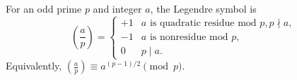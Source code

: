 For an odd prime $p$ and integer $a$, the Legendre symbol is
$$\left(\frac{a}{p}\right) = \begin{cases} +1 & a \text{ is quadratic residue mod } p, p \nmid a, \\ -1 & a \text{ is nonresidue mod } p, \\ 0 & p \mid a. \end{cases}$$
Equivalently, $(\frac{a}{p}) \equiv a^{(p-1)/2} \pmod{p}$.

